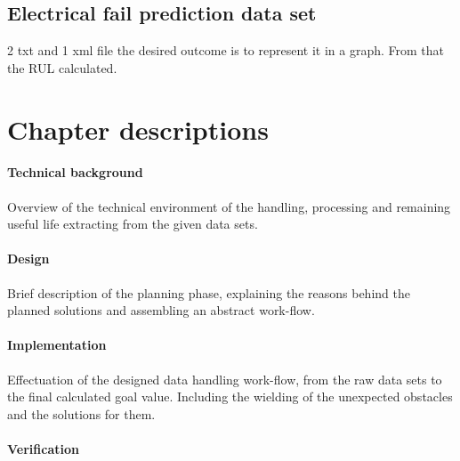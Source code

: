   \subsection{Electrical fail prediction data set}
2 txt and 1 xml file the desired outcome is to represent it in a graph. From that the RUL calculated.

\section{Chapter descriptions}
		\paragraph{Technical background}

Overview of the technical environment of the handling, processing and remaining useful life extracting from the given data sets.

		\paragraph{Design}

Brief description of the planning phase, explaining the reasons behind the planned solutions and assembling an abstract work-flow.

		\paragraph{Implementation}

Effectuation of the designed data handling work-flow, from the raw data sets to the final calculated goal value. Including the wielding of the unexpected obstacles and the solutions for them.

		\paragraph{Verification}

